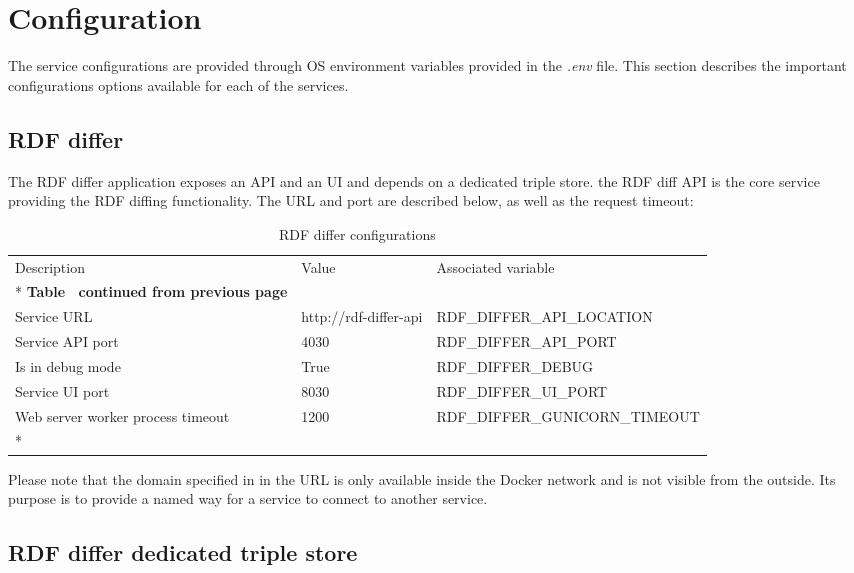 \section{Configuration}
\label{sec:configuration}

	The service configurations are provided through OS environment variables provided in the \textit{.env} file. This section describes the important configurations options available for each of the services.
	
	\subsection{RDF differ}
	
	The RDF differ application exposes an API and an UI and depends on a dedicated triple store. the RDF diff API is the core service providing the RDF diffing functionality. The URL and port are described below, as well as the request timeout:
	
	\begin{longtable}[c]{@{}p{3.5cm}p{3.5cm}l@{}}
		\toprule
		Description & Value & Associated variable \\* \midrule
		\endfirsthead
		\multicolumn{3}{c}%
		{{\bfseries Table \thetable\ continued from previous page}} \\
		\endhead
		\bottomrule
		\endfoot
		\endlastfoot
		Service URL & http://rdf-differ-api & RDF\_DIFFER\_API\_LOCATION \\
		Service API port & 4030 & RDF\_DIFFER\_API\_PORT \\
		Is in debug mode & True & RDF\_DIFFER\_DEBUG \\
		Service UI port & 8030 & RDF\_DIFFER\_UI\_PORT \\
		Web server worker process timeout & 1200 & RDF\_DIFFER\_GUNICORN\_TIMEOUT \\* \bottomrule
		\caption{RDF differ configurations}
		\label{tab:my-table1}\\
	\end{longtable}

	Please note that the domain specified in in the URL is only available inside the Docker network and is not visible from the outside. Its purpose is to provide a named way for a service to connect to another service. 
	
	\subsection{RDF differ dedicated triple store}
	
